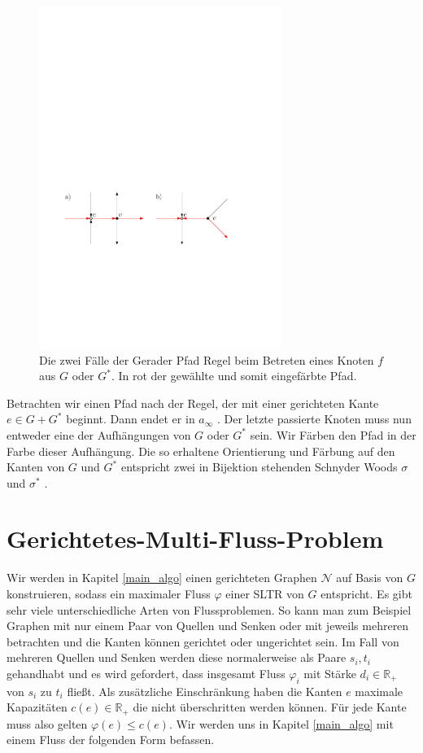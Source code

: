 \begin{figure}
	\centering
	\includegraphics[width=0.7\textwidth]{straight_path.pdf}
  \caption{Die zwei Fälle der Gerader Pfad Regel beim Betreten eines Knoten $f$ aus $G$ oder $G^*$. In rot der gewählte und somit eingefärbte Pfad.}
  \label{straight_path}
\end{figure}

Betrachten wir einen Pfad nach der Regel, der mit einer gerichteten Kante $e \in G+G^*$ beginnt. Dann endet er in $a_\infty$ \cite[Lemma 15]{felsner01}. Der letzte passierte Knoten muss nun entweder eine der Aufhängungen von $G$ oder $G^*$ sein. Wir Färben den Pfad in der Farbe dieser Aufhängung. Die so erhaltene Orientierung und Färbung auf den Kanten von $G$ und $G^*$ entspricht zwei in Bijektion stehenden Schnyder Woods $\sigma$ und $\sigma^*$ \cite{felsner01}.

\section{Gerichtetes-Multi-Fluss-Problem}\label{dir_multi_flow}

Wir werden in Kapitel \ref{main_algo} einen gerichteten Graphen $\mathcal{N}$ auf Basis von $G$ konstruieren, sodass ein maximaler Fluss $\varphi$ einer SLTR von $G$ entspricht. Es gibt sehr viele unterschiedliche Arten von Flussproblemen. So kann man zum Beispiel Graphen mit nur einem Paar von Quellen und Senken oder mit jeweils mehreren betrachten und die Kanten können gerichtet oder ungerichtet sein. Im Fall von mehreren Quellen und Senken werden diese normalerweise als Paare $s_i,t_i$ gehandhabt und es wird gefordert, dass insgesamt Fluss $\varphi_i$ mit Stärke $d_i \in \mathbb{R}_+$ von $s_i$ zu $t_i$ fließt. Als zusätzliche Einschränkung haben die Kanten $e$ maximale Kapazitäten $c(e) \in \mathbb{R}_+$ die nicht überschritten werden können. Für jede Kante muss also gelten $\varphi(e) \leq c(e)$. Wir werden uns in Kapitel \ref{main_algo} mit einem Fluss der folgenden Form befassen.

